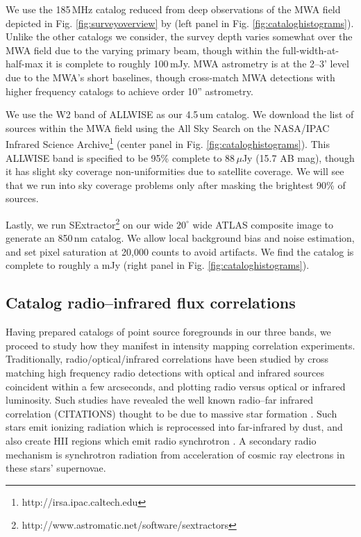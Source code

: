 \documentclass{emulateapj}
\begin{document}
We use the 185\,MHz catalog reduced from deep observations of the MWA field depicted in Fig. \ref{fig:surveyoverview} by \citep{PattiCatalog1} (left panel in Fig. \ref{fig:cataloghistograms}). Unlike the other catalogs we consider, the survey depth varies somewhat over the MWA field due to the varying primary beam, though within the full-width-at-half-max it is complete to roughly 100\,mJy. MWA astrometry is at the 2--3' level due to the MWA's short baselines, though \citep{PattiCatalog1} cross-match MWA detections with higher frequency catalogs to achieve order 10'' astrometry. 

We use the W2 band of ALLWISE \citep{Wright2010,allwise} as our 4.5\,um catalog. We download the list of sources within the MWA field using the All Sky Search on the NASA/IPAC Infrared Science Archive\footnote{http://irsa.ipac.caltech.edu} (center panel in Fig. \ref{fig:cataloghistograms}). This ALLWISE band is specified to be 95\% complete to 88\,$\mu$Jy (15.7 AB mag), though it has slight sky coverage non-uniformities due to satellite coverage. We will see that we run into sky coverage problems only after masking the brightest 90\% of sources.

Lastly, we run SExtractor\footnote{http://www.astromatic.net/software/sextractors} \citep{sextractor} on our wide $20^\circ$ wide ATLAS composite image to generate an 850\,nm catalog. We allow local background bias and noise estimation, and set pixel saturation at 20,000 counts to avoid artifacts. We find the catalog is complete to roughly a mJy (right panel in Fig. \ref{fig:cataloghistograms}). 


\subsection{Catalog radio--infrared flux correlations}

Having prepared catalogs of point source foregrounds in our three bands, we proceed to study how they manifest in intensity mapping correlation experiments. Traditionally, radio/optical/infrared correlations have been studied by cross matching high frequency radio detections with optical and infrared sources coincident within a few arcseconds, and plotting radio versus optical or infrared luminosity. Such studies have revealed the well known radio--far infrared correlation (CITATIONS) thought to be due to massive star formation \citep[e.g.][]{helou85,dejong85,yun01,xu94}. Such stars emit ionizing radiation which is reprocessed into far-infrared by dust, and also create HII regions which emit radio synchrotron \citep{xu94}. A secondary radio mechanism is synchrotron radiation from acceleration of cosmic ray electrons in these stars' supernovae. 
\end{document}
